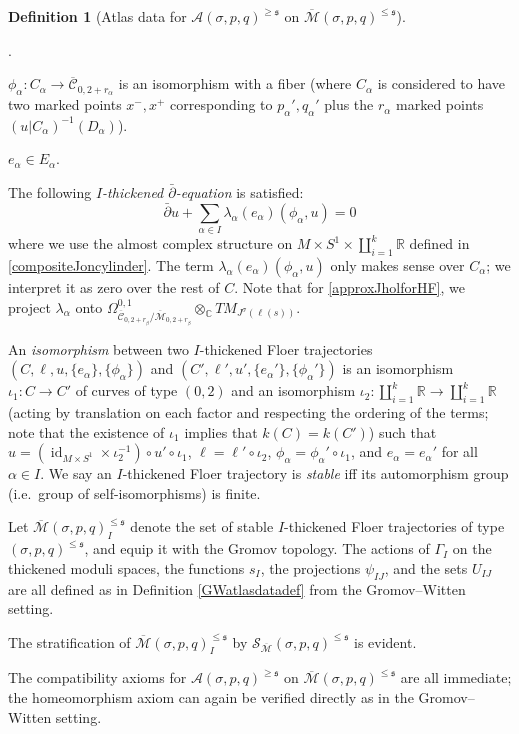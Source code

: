 \documentclass[12pt]{article}
\theoremstyle{definition}
\newtheorem{definition}[theorem]{Definition}
\theoremstyle{remark}
\numberwithin{equation}{subsection}
\newcommand{\s}{\mathfrak s}
\newcommand{\CC}{\mathbb C}
\newcommand{\RR}{\mathbb R}
\newcommand{\SSS}{\mathcal S}
\newcommand{\A}{\mathcal A}
\newcommand{\Mbar}{\overline{\mathcal M}}
\newcommand{\Cbar}{\overline{\mathcal C}}
\newcommand{\delbar}{\bar\partial}
\newcommand{\id}{\operatorname{id}}
\newcounter{rcounti}
\newenvironment{rlist}{\begin{list}{\roman{rcounti}.}{\usecounter{rcounti}
\setlength\itemsep{0pt}
\setlength\labelsep{4pt}
\setlength\labelwidth{16pt}
\setlength\leftmargin{32pt}
\setlength\listparindent{0pt}
\setlength\parsep{0pt}
\setlength\parskip{0pt}
\setlength\partopsep{0pt}
\setlength\rightmargin{0pt}
\setlength\topsep{0pt}
\setlength\itemindent{0pt}
}}{\end{list}}
\begin{document}
\begin{definition}[Atlas data for $\A(\sigma,p,q)^{\geq\s}$ on $\Mbar(\sigma,p,q)^{\leq\s}$]
\begin{rlist}
\item\label{hfiaxpxmpart}$\phi_\alpha:C_\alpha\to\Cbar_{0,2+r_\alpha}$ is an isomorphism with a fiber (where $C_\alpha$ is considered to have two marked points $x^-,x^+$ corresponding to $p_\alpha',q_\alpha'$ plus the $r_\alpha$ marked points $(u|C_\alpha)^{-1}(D_\alpha)$).
\item$e_\alpha\in E_\alpha$.
\item The following \emph{$I$-thickened $\delbar$-equation} is satisfied:
\begin{equation}\label{approxJholforHF}
\delbar u+\sum_{\alpha\in I}\lambda_\alpha(e_\alpha)(\phi_\alpha,u)=0
\end{equation}
where we use the almost complex structure on $M\times S^1\times\coprod_{i=1}^k\RR$ defined in \eqref{compositeJoncylinder}.  The term $\lambda_\alpha(e_\alpha)(\phi_\alpha,u)$ only makes sense over $C_\alpha$; we interpret it as zero over the rest of $C$.  Note that for \eqref{approxJholforHF}, we project $\lambda_\alpha$ onto $\Omega^{0,1}_{\Cbar_{0,2+r_\beta}/\Mbar_{0,2+r_\beta}}\otimes_\CC TM_{J^\sigma(\ell(s))}$.
\end{rlist}
An \emph{isomorphism} between two $I$-thickened Floer trajectories $(C,\ell,u,\{e_\alpha\},\{\phi_\alpha\})$ and $(C',\ell',u',\{e_\alpha'\},\{\phi_\alpha'\})$ is an isomorphism $\iota_1:C\to C'$ of curves of type $(0,2)$ and an isomorphism $\iota_2:\coprod_{i=1}^k\RR\to\coprod_{i=1}^k\RR$ (acting by translation on each factor and respecting the ordering of the terms; note that the existence of $\iota_1$ implies that $k(C)=k(C')$) such that $u=(\id_{M\times S^1}\times\iota_2^{-1})\circ u'\circ\iota_1$, $\ell=\ell'\circ\iota_2$, $\phi_\alpha=\phi_\alpha'\circ\iota_1$, and $e_\alpha=e_\alpha'$ for all $\alpha\in I$.  We say an $I$-thickened Floer trajectory is \emph{stable} iff its automorphism group (i.e.\ group of self-isomorphisms) is finite.

Let $\Mbar(\sigma,p,q)^{\leq\s}_I$ denote the set of stable $I$-thickened Floer trajectories of type $(\sigma,p,q)^{\leq\s}$, and equip it with the Gromov topology.  The actions of $\Gamma_I$ on the thickened moduli spaces, the functions $s_I$, the projections $\psi_{IJ}$, and the sets $U_{IJ}$ are all defined as in Definition \ref{GWatlasdatadef} from the Gromov--Witten setting.

The stratification of $\Mbar(\sigma,p,q)^{\leq\s}_I$ by $\SSS_{\Mbar}(\sigma,p,q)^{\leq\s}$ is evident.
\end{definition}

The compatibility axioms for $\A(\sigma,p,q)^{\geq\s}$ on $\Mbar(\sigma,p,q)^{\leq\s}$ are all immediate; the homeomorphism axiom can again be verified directly as in the Gromov--Witten setting.
\end{document}
